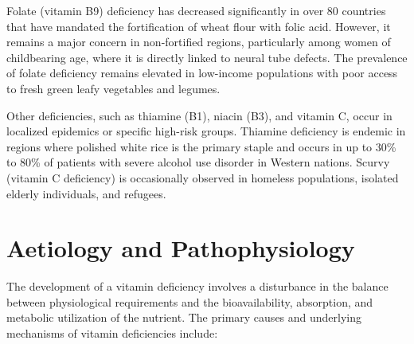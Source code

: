Folate (vitamin B9) deficiency has decreased significantly in over 80 countries that have mandated the fortification of wheat flour with folic acid. However, it remains a major concern in non-fortified regions, particularly among women of childbearing age, where it is directly linked to neural tube defects. The prevalence of folate deficiency remains elevated in low-income populations with poor access to fresh green leafy vegetables and legumes.

Other deficiencies, such as thiamine (B1), niacin (B3), and vitamin C, occur in localized epidemics or specific high-risk groups. Thiamine deficiency is endemic in regions where polished white rice is the primary staple and occurs in up to 30\% to 80\% of patients with severe alcohol use disorder in Western nations. Scurvy (vitamin C deficiency) is occasionally observed in homeless populations, isolated elderly individuals, and refugees.

\section*{Aetiology and Pathophysiology}
The development of a vitamin deficiency involves a disturbance in the balance between physiological requirements and the bioavailability, absorption, and metabolic utilization of the nutrient. The primary causes and underlying mechanisms of vitamin deficiencies include:

